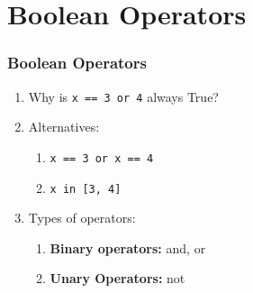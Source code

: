 \documentclass{beamer}
\begin{document}
%
%
\section{Boolean Operators}
\begin{frame}[fragile]
  \frametitle{Boolean Operators}
  \begin{enumerate}[A]
    \item Why is \lstinline|x == 3 or 4| always True?
    \item Alternatives:
      \begin{enumerate}
        \item \lstinline|x == 3 or x == 4|
        \item \lstinline|x in [3, 4]|
      \end{enumerate}
    \item Types of operators:
      \begin{enumerate}
        \item \textbf{Binary operators:} and, or
        \item \textbf{Unary Operators: } not
      \end{enumerate}
  \end{enumerate}
\end{frame}
\end{document}
